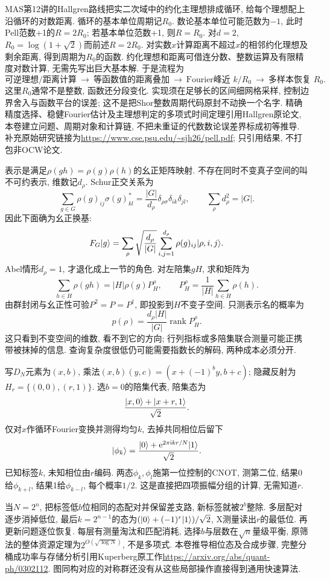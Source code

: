 MAS第12讲的Hallgren路线把实二次域中的约化主理想排成循环, 给每个理想配上沿循环的对数距离. 循环的基本单位周期记$R_0$. 数论基本单位可能范数为$-1$, 此时Pell范数+1的$R=2R_0$; 若基本单位范数+1, 则$R=R_0$. 对$d=2$, $R_0=\log(1+\sqrt2)$而前述$R=2R_0$. 对实数$x$计算距离不超过$x$的相邻约化理想及剩余距离, 得到周期为$R_0$的函数. 约化理想和距离可借连分数、整数运算及有限精度对数计算, 无需先写出巨大基本解. 于是流程为
\[\text{可逆理想/距离计算}\ \longrightarrow\
 \text{等函数值的距离叠加}\ \longrightarrow\
 \text{Fourier峰近 }k/R_0\ \longrightarrow\
 \text{多样本恢复 }R_0.\]
这里$R_0$通常不是整数, 函数还分段变化. 实现须在足够长的区间细网格采样, 控制边界舍入与函数平台的误差; 这不是把Shor整数周期代码原封不动换一个名字. 精确精度选择、稳健Fourier估计及主理想判定的多项式时间定理引用Hallgren原论文, 本卷建立问题、周期对象和计算链, 不把未重证的代数数论误差界标成初等推导. 补充原始研究链接为\url{https://www.cse.psu.edu/~sjh26/pell.pdf}; 只引用结果, 不打包非OCW论文.

表示是满足$\rho(gh)=\rho(g)\rho(h)$的幺正矩阵映射. 不存在同时不变真子空间的叫不可约表示, 维数记$d_\rho$. Schur正交关系为
\[\sum_{g\in G}\rho(g)_{ij}\sigma(g)_{kl}^{*}
 =\frac{|G|}{d_\rho}\delta_{\rho\sigma}\delta_{ik}\delta_{jl},\qquad
 \sum_\rho d_\rho^2=|G|.\]
因此下面确为幺正换基:
\[F_G\lvert g\rangle=\sum_\rho\sqrt{\frac{d_\rho}{|G|}}
 \sum_{i,j=1}^{d_\rho}\rho(g)_{ij}\lvert \rho,i,j\rangle.\]
Abel情形$d_\rho=1$, 才退化成上一节的角色. 对左陪集$gH$, 求和矩阵为
\[\sum_{h\in H}\rho(gh)=|H|\rho(g)P_H^\rho,\qquad
 P_H^\rho=\frac1{|H|}\sum_{h\in H}\rho(h).\]
由群封闭与幺正性可验$P^2=P=P^\dagger$, 即投影到$H$不变子空间. 只测表示名的概率为
\[p(\rho)=\frac{d_\rho|H|}{|G|}\operatorname{rank}P_H^\rho.\]
这只看到不变空间的维数, 看不到它的方向; 行列指标或多陪集联合测量可能正携带被抹掉的信息. 查询复杂度很低仍可能需要指数长的解码, 两种成本必须分开.

\originalsection{二面体相位态与筛法的局部步骤}
写$D_N$元素为$(x,b)$, 乘法$(x,b)(y,c)=(x+(-1)^by,b+c)$; 隐藏反射为$H_r=\{(0,0),(r,1)\}$. 选$b=0$的陪集代表, 陪集态为
\[\frac{\lvert x,0\rangle+\lvert x+r,1\rangle}{\sqrt2}.\]
仅对$x$作循环Fourier变换并测得均匀$k$, 去掉共同相位后留下
\[\lvert \phi_k\rangle=\frac{\lvert 0\rangle+\mathrm e^{2\pi\mathrm i kr/N}\lvert 1\rangle}{\sqrt2}.\]
已知标签$k$, 未知相位由$r$编码. 两态$\phi_k,\phi_l$施第一位控制的CNOT, 测第二位, 结果0给$\phi_{k+l}$, 结果1给$\phi_{k-l}$, 每个概率$1/2$. 这是直接把四项振幅分组的计算, 无需知道$r$.

当$N=2^n$, 把标签低$b$位相同的态配对并保留差支路, 新标签就被$2^b$整除. 多层配对逐步消掉低位, 最后$k=2^{n-1}$的态为$(\lvert 0\rangle+(-1)^r\lvert 1\rangle)/\sqrt2$, X测量读出$r$的最低位. 再更新问题逐位恢复. 每层有测量淘汰和匹配消耗, 选择$b$与层数在$\sqrt n$量级平衡, 原筛法的整体资源定理为$2^{O(\sqrt{\log N})}$, 不是多项式. 本卷推导相位态及合成步骤, 完整分桶成功率与存储分析引用Kuperberg原工作\url{https://arxiv.org/abs/quant-ph/0302112}. 图同构对应的对称群还没有从这些局部操作直接得到通用快速算法.

